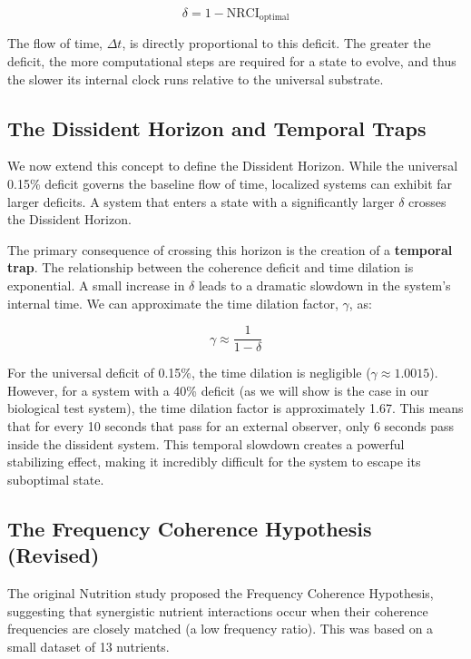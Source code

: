 \documentclass[12pt, a4paper]{article}
\begin{document}
\begin{equation}
\delta = 1 - \text{NRCI}_{\text{optimal}}
\end{equation}

The flow of time, $\Delta t$, is directly proportional to this deficit. The greater the deficit, the more computational steps are required for a state to evolve, and thus the slower its internal clock runs relative to the universal substrate.

\subsection{The Dissident Horizon and Temporal Traps}

We now extend this concept to define the Dissident Horizon. While the universal 0.15\% deficit governs the baseline flow of time, localized systems can exhibit far larger deficits. A system that enters a state with a significantly larger $\delta$ crosses the Dissident Horizon.

The primary consequence of crossing this horizon is the creation of a \textbf{temporal trap}. The relationship between the coherence deficit and time dilation is exponential. A small increase in $\delta$ leads to a dramatic slowdown in the system’s internal time. We can approximate the time dilation factor, $\gamma$, as:

\begin{equation}
\gamma \approx \frac{1}{1 - \delta}
\end{equation}

For the universal deficit of 0.15\%, the time dilation is negligible ($\gamma \approx 1.0015$). However, for a system with a 40\% deficit (as we will show is the case in our biological test system), the time dilation factor is approximately 1.67. This means that for every 10 seconds that pass for an external observer, only 6 seconds pass inside the dissident system. This temporal slowdown creates a powerful stabilizing effect, making it incredibly difficult for the system to escape its suboptimal state.

\subsection{The Frequency Coherence Hypothesis (Revised)}

The original Nutrition study proposed the Frequency Coherence Hypothesis, suggesting that synergistic nutrient interactions occur when their coherence frequencies are closely matched (a low frequency ratio). This was based on a small dataset of 13 nutrients.
\end{document}
